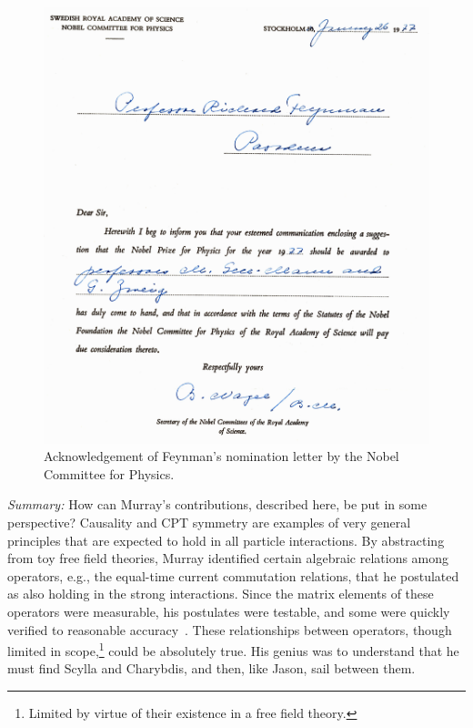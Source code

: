 \documentclass[12pt]{article}
\begin{document}
\begin{figure}
   \centering
   \includegraphics[scale=0.8]{AcademyLetterCroppedA}
   \caption{Acknowledgement of Feynman's nomination letter by the Nobel Committee for Physics.}
   \label{fig:letter}
\end{figure}

{\it Summary:} How can Murray's contributions, described here,  be put in some perspective? Causality and CPT symmetry are examples of very general principles that are expected to hold in all particle interactions. By abstracting from toy free field theories, Murray identified certain algebraic relations among operators, e.g., the equal-time current commutation relations, that he postulated as also holding in the strong interactions. Since the matrix elements of these operators were measurable, his postulates were testable, and some were quickly verified to reasonable accuracy~\cite{SAsumRules,WWsumRules}.  These relationships between operators, though limited in scope,\footnote{Limited by virtue of their existence in a free field theory.} could be absolutely true. His genius was to understand that he must find Scylla and Charybdis, and then, like Jason, sail between them. 
\end{document}

